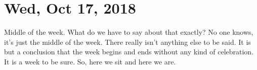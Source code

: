 \section{Wed, Oct 17, 2018}

Middle of the week. What do we have to say about that exactly? No one knows, it's
just the middle of the week. There really isn't anything else to be said. It is but a
conclusion that the week begins and ends without any kind of celebration. It is a
week to be sure. So, here we sit and here we are.